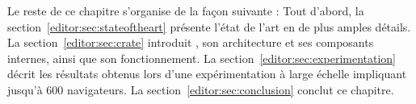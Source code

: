 Le reste de ce chapitre s'organise de la façon suivante : Tout d'abord, la
section~\ref{editor:sec:stateoftheart} présente l'état de l'art en de plus
amples détails. La section~\ref{editor:sec:crate} introduit \CRATE, son
architecture et ses composants internes, ainsi que son fonctionnement. La
section~\ref{editor:sec:experimentation} décrit les résultats obtenus lors d'une
expérimentation à large échelle impliquant jusqu'à 600 navigateurs. La
section~\ref{editor:sec:conclusion} conclut ce chapitre.



